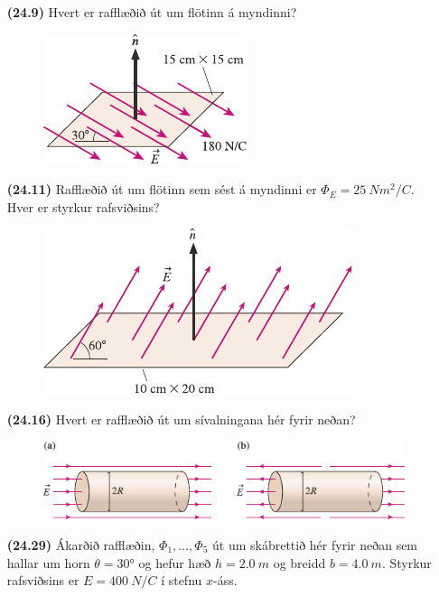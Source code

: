 \begin{enumerate}[label = \textbf{(\alph*)}]

\item[\textbf{(24.9)}] Hvert er rafflæðið út um flötinn á myndinni?

\begin{figure}[H]
    \centering
    \includegraphics{figures/rk229.pdf}
\end{figure}

\item[\textbf{(24.11)}] Rafflæðið út um flötinn sem sést á myndinni er $\Phi_E = \SI{25}{Nm^2/C}$. Hver er styrkur rafsviðsins?

\begin{figure}[H]
    \centering
    \includegraphics[scale = 0.8]{figures/rk2411.pdf}
\end{figure}

\item[\textbf{(24.16)}] Hvert er rafflæðið út um sívalningana hér fyrir neðan?

\begin{figure}[H]
    \centering
    \includegraphics{figures/rk2416.pdf}
\end{figure}


\item[\textbf{(24.29)}] Ákarðið rafflæðin, $\Phi_1, \ldots, \Phi_5$ út um skábrettið hér fyrir neðan sem hallar um horn $\theta = \ang{30}$ og hefur hæð $h = \SI{2.0}{m}$ og breidd $b = \SI{4.0}{m}$. Styrkur rafsviðsins er $E = \SI{400}{N/C}$ í stefnu $x$-áss.


\end{enumerate}
